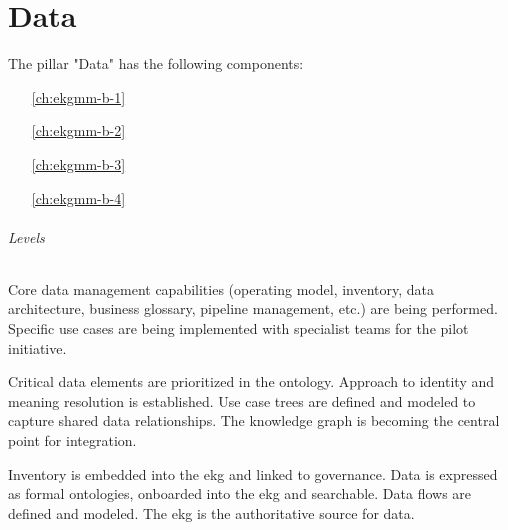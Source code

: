 \part{Data}\label{pt:ekgmm-b} %

The pillar "Data" has the following components:

\begin{itemize}[leftmargin=.5in]
  \item [\ref{ch:ekgmm-b-1}] 
  \item [\ref{ch:ekgmm-b-2}] 
  \item [\ref{ch:ekgmm-b-3}] 
  \item [\ref{ch:ekgmm-b-4}] 
\end{itemize}

\paragraph{Levels}

\begin{description}[nosep,font=\bfseries]

    \item [1. \glsfmtshort{ekg} Initiation, \glsfmtshort{mvp}]
    Core data management capabilities (operating model, inventory, data architecture, business
    glossary, pipeline management, etc.) are being performed.
    Specific use cases are being implemented with specialist teams for the pilot initiative.
    
    \item [2. Extensible Platform (reusable components)]
    Critical data elements are prioritized in the ontology.
    Approach to identity and meaning resolution is established.
    Use case trees are defined and modeled to capture shared data relationships.
    The knowledge graph is becoming the central point for integration.

    \item [3. Enterprise Ready]
    Inventory is embedded into the \gls{ekg} and linked to governance.
    Data is expressed as formal ontologies, onboarded into the \gls{ekg} and searchable.
    Data flows are defined and modeled.
    The \gls{ekg} is the authoritative source for data.

\end{description}






